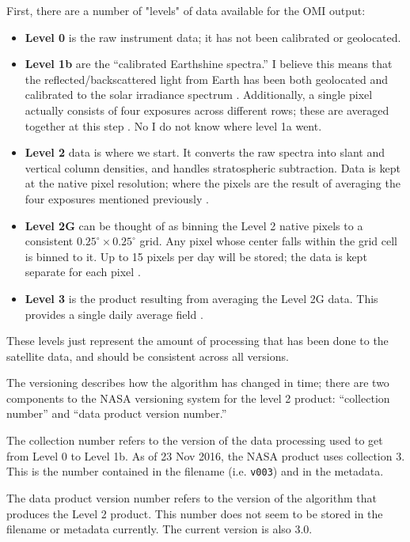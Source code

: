 \documentclass[12pt]{article}
\begin{document}
	First, there are a number of "levels" of data available for the OMI output:
	\begin{itemize}
	\item \textbf{Level 0} is the raw instrument data; it has not been calibrated or geolocated.
	\item \textbf{Level 1b} are the ``calibrated Earthshine spectra.'' I believe this means that the reflected/backscattered light from Earth has been both geolocated and calibrated to the solar irradiance spectrum \citep{knmi-level0-1b, van-der-Oord06}. Additionally, a single pixel actually consists of four exposures across different rows; these are averaged together at this step \citep{van-der-Oord06}. No I do not know where level 1a went.
	\item \textbf{Level 2} data is where we start. It converts the raw spectra into slant and vertical column densities, and handles stratospheric subtraction. Data is kept at the native pixel resolution; where the pixels are the result of averaging the four exposures mentioned previously \citep{omi-readme, bucsela13, marchenko15}.
	\item \textbf{Level 2G} can be thought of as binning the Level 2 native pixels to a consistent $0.25^\circ \times 0.25^\circ$ grid. Any pixel whose center falls within the grid cell is binned to it. Up to 15 pixels per day will be stored; the data is kept separate for each pixel \citep{omi-readme}.
	\item \textbf{Level 3} is the product resulting from averaging the Level 2G data. This provides a single daily average field \citep{omi-readme}.
	\end{itemize}	
	
	These levels just represent the amount of processing that has been done to the satellite data, and should be consistent across all versions.
	
	\vspace{1em}
	The versioning describes how the algorithm has changed in time; there are two components to the NASA versioning system for the level 2 product: ``collection number'' and ``data product version number.'' 
	
	The collection number refers to the version of the data processing used to get from Level 0 to Level 1b. As of 23 Nov 2016, the NASA product uses collection 3.  This is the number contained in the filename (i.e. \texttt{v003}) and in the metadata.
	
	The data product version number refers to the version of the algorithm that produces the Level 2 product. This number does not seem to be stored in the filename or metadata currently. The current version is also 3.0.
	
\end{document}
